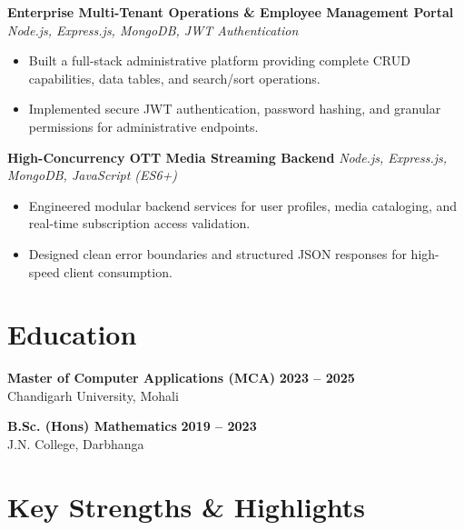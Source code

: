 \documentclass[a4paper,10pt]{article}
\begin{document}
\textbf{Enterprise Multi-Tenant Operations \& Employee Management Portal}
\hfill
\textit{Node.js, Express.js, MongoDB, JWT Authentication}

\begin{itemize}

    \item Built a full-stack administrative platform providing complete CRUD capabilities, data tables, and search/sort operations.

    \item Implemented secure JWT authentication, password hashing, and granular permissions for administrative endpoints.

\end{itemize}


\textbf{High-Concurrency OTT Media Streaming Backend}
\hfill
\textit{Node.js, Express.js, MongoDB, JavaScript (ES6+)}

\begin{itemize}

    \item Engineered modular backend services for user profiles, media cataloging, and real-time subscription access validation.

    \item Designed clean error boundaries and structured JSON responses for high-speed client consumption.

\end{itemize}

\section*{Education}

\textbf{Master of Computer Applications (MCA)}
\hfill
\textbf{2023 -- 2025}
\\
Chandigarh University, Mohali

\vspace{3pt}

\textbf{B.Sc. (Hons) Mathematics}
\hfill
\textbf{2019 -- 2023}
\\
J.N. College, Darbhanga

\section*{Key Strengths \& Highlights}
\end{document}

